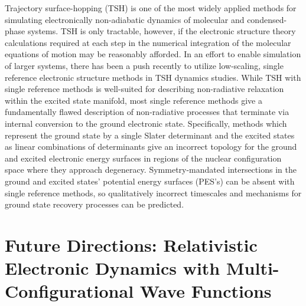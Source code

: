 \documentclass[12pt]{article}
\begin{document}
Trajectory surface-hopping (TSH) is one of the most widely applied methods for
simulating electronically non-adiabatic dynamics of molecular and
condensed-phase
systems.\cite{Barbatti11_1759,Tavernelli14_62,Tully12_22A301,Tully98_407,Hynes14_97}
TSH is only tractable, however, if the electronic structure theory calculations
required at each step in the numerical integration of the molecular equations
of motion  may be reasonably afforded.  In an effort to enable simulation of
larger systems, there has been a push recently to utilize low-scaling, single
reference electronic structure methods in TSH dynamics
studies.\cite{Lan15_1360,Rothlisberger07_023001,Li16_935} While TSH with single
reference  methods is well-suited for describing non-radiative relaxation
within the excited state manifold\cite{Subotnik14_4253,Barbatti14_1395}, most
single reference  methods give a fundamentally flawed description of
non-radiative processes that terminate via internal conversion to the ground
electronic state.  Specifically, methods which represent the ground state by a
single Slater determinant and the excited states as linear combinations of
determinants give an incorrect topology for the ground and excited
electronic energy surfaces in regions of the nuclear configuration space where
they approach degeneracy.\cite{Massimo14_3074, Martinez06_1039,Li16_pp-TSH}
Symmetry-mandated intersections in the ground and excited states' potential
energy surfaces (PES's) can be absent with single reference  methods, so
qualitatively incorrect timescales and mechanisms for ground state recovery
processes can be predicted.  



\section{Future Directions: Relativistic Electronic Dynamics with Multi-Configurational Wave Functions}
\label{sec:Future}


\end{document}
